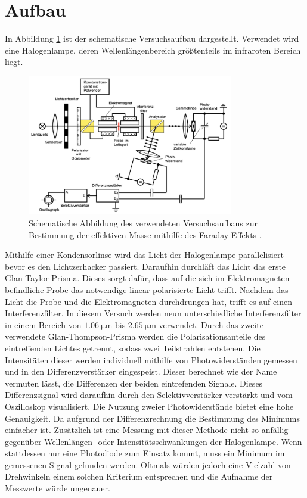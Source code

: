 \section{Aufbau}
In Abbildung \ref{fig:schemAufbau} ist der schematische Versuchsaufbau dargestellt. Verwendet wird
eine Halogenlampe, deren Wellenlängenbereich größtenteils im infraroten Bereich liegt.
\begin{figure}[H]
    \centering
    \includegraphics[width=0.8\textwidth]{images/SchemAufbau.pdf}
    \caption{Schematische Abbildung des verwendeten Versuchsaufbaus zur Bestimmung der effektiven
     Masse mithilfe des Faraday-Effekts \cite{anleitung}.}
    \label{fig:schemAufbau}
\end{figure} \noindent
Mithilfe einer Kondensorlinse wird das Licht der Halogenlampe parallelisiert bevor es den Lichtzerhacker passiert.
Daraufhin durchläft das Licht das erste Glan-Taylor-Prisma. Dieses sorgt dafür, dass auf die sich im
Elektromagneten befindliche Probe das notwendige linear polarisierte Licht trifft. 
Nachdem das Licht die Probe und die Elektromagneten durchdrungen hat, trifft es auf einen Interferenzfilter.
In diesem Versuch werden neun unterschiedliche Interferenzfilter in einem Bereich von $\SI{1.06}{\micro\meter}$ bis $\SI{2.65}{\micro\meter}$
verwendet. Durch das zweite verwendete Glan-Thompson-Prisma werden die Polarisationsanteile des 
eintreffenden Lichtes getrennt, sodass zwei Teilstrahlen entstehen. Die Intensitäten dieser werden
individuell mithilfe von Photowiderständen gemessen und in den Differenzverstärker eingespeist. Dieser 
berechnet wie der Name vermuten lässt, die Differenzen der beiden eintrefenden Signale. Dieses
Differenzsignal wird daraufhin durch den Selektivverstärker verstärkt und vom Oszilloskop visualisiert. 
Die Nutzung zweier Photowiderstände bietet eine hohe Genauigkeit. Da aufgrund der Differenzrechnung die
Bestimmung des Minimums einfacher ist. Zusätzlich ist eine Messung mit dieser Methode nicht so anfällig
gegenüber Wellenlängen- oder Intensitätsschwankungen der Halogenlampe.
Wenn stattdessen nur eine Photodiode zum Einsatz kommt, muss ein Minimum im gemessenen Signal gefunden 
werden. Oftmals würden jedoch eine Vielzahl von Drehwinkeln einem solchen Kriterium entsprechen 
und die Aufnahme der Messwerte würde ungenauer. 

